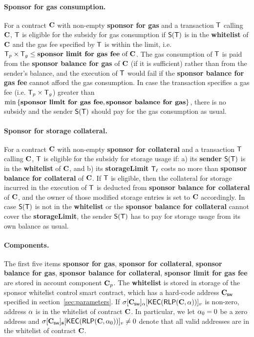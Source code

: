 \paragraph{Sponsor for gas consumption.}
For a contract $\mathbf{C}$ with non-empty {\bf sponsor for gas} and a transaction $\textsf{T}$ calling $\mathbf{C}$, 
$\textsf{T}$ is eligible for the subsidy for gas consumption 
if $\mathsf{S} (\textsf{T})$ is in the \textbf{whitelist} of $\mathbf{C}$
and the gas fee specified by $\textsf{T}$ is within the limit, i.e. $\textsf{T}_p\times\textsf{T}_g \le \text{\textbf{sponsor limit for gas fee} of $\mathbf{C}$}$.
The gas consumption of $\textsf{T}$ is paid from the \textbf{sponsor balance for gas} of $\mathbf{C}$ (if it is sufficient) rather than from the sender's balance,
and the execution of $\textsf{T}$ would fail if the \textbf{sponsor balance for gas fee} cannot afford the gas consumption.
In case the transaction specifies a gas fee (i.e. $\textsf{T}_p\times\textsf{T}_g$) greater than $\min{\left \{{\textbf{sponsor limit for gas fee}, \textbf{sponsor balance for gas}} \right \}}$, there is no subsidy and the sender $\mathsf{S}{\left({\textsf{T}} \right)}$ should pay for the gas consumption as usual.

\paragraph{Sponsor for storage collateral.}
For a contract $\mathbf{C}$ with non-empty {\bf sponsor for collateral} and a transaction $\textsf{T}$ calling $\mathbf{C}$,
$\textsf{T}$ is eligible for the subsidy for storage usage if: 
a) its {\bf sender} $\mathsf{S}{\left({\textsf{T}} \right)}$ is in the \textbf{whitelist} of $\mathbf{C}$, and 
b) its {\bf storageLimit} $\textsf{T}_\ell$ costs no more than {\bf sponsor balance for collateral} of $\mathbf{C}$. 
If $\textsf{T}$ is eligible, then the collateral for storage incurred in the execution of $\textsf{T}$ 
is deducted from \textbf{sponsor balance for collateral} of $\mathbf{C}$, 
and the owner of those modified storage entries is set to $\mathbf{C}$ accordingly.
In case $\mathsf{S}{\left({\textsf{T}} \right)}$ is not in the \textbf{whitelist} or the \textbf{sponsor balance for collateral} cannot cover the {\bf storageLimit}, the sender $\mathsf{S}{\left({\textsf{T}} \right)}$ has to pay for storage usage from its own balance as usual.

\paragraph{Components.} The first five items {\bf sponsor for gas}, {\bf sponsor for collateral}, {\bf sponsor balance for gas}, {\bf sponsor balance for collateral}, {\bf sponsor limit for gas fee} are stored in account component $\mathbf{C}_p$. The {\bf whitelist} is stored in storage of the sponsor whitelist control smart contract, which has a hard-code address $\mathbf{C}_{\sf sw}$ specified in section~\ref{sec:parameters}. If $\mathbf{\sigma}[\mathbf{C}_{\sf sw}]_{\bf \mathbf{\alpha}}[\mathsf{KEC}(\mathsf{RLP}(\mathbf{C},\mathbf{\alpha}))]_v$ is non-zero, address $\mathbf{\alpha}$ is in the whitelist of contract $\mathbf{C}$. 
In particular, we let $\mathbf{\alpha}_0=0$ be a zero address and $\mathbf{\sigma}[\mathbf{C}_{\sf sw}]_{\bf s}[\mathsf{KEC}(\mathsf{RLP}(\mathbf{C},\mathbf{\alpha}_0))]_v\neq 0$ denote that all valid addresses are in the whitelist of contract $\mathbf{C}$. 


